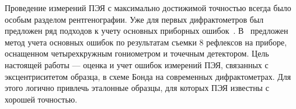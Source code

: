 Проведение измерений ПЭЯ с максимально достижимой точностью всегда было особым разделом рентгенографии.
Уже для первых дифрактометров был предложен ряд подходов к учету основных приборных ошибок~\cite{Ponomarev:1969}. В~\cite{King:1979} предложен метод учета основных ошибок по результатам съемки 8 рефлексов на приборе, оснащенном четырехкружным гониометром и точечным детектором.
Цель настоящей работы --- оценка и учет ошибок измерений ПЭЯ, связанных с эксцентриситетом образца, в схеме Бонда на современных дифрактометрах.
Для этого логично привлечь эталонные образцы, для которых ПЭЯ известны с хорошей точностью.
